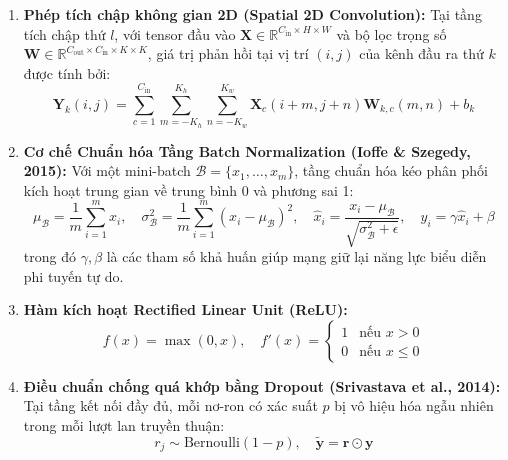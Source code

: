\documentclass[a4paper, 11pt]{article}
\begin{document}
\begin{enumerate}
    \item \textbf{Phép tích chập không gian 2D (Spatial 2D Convolution):} Tại tầng tích chập thứ $l$, với tensor đầu vào $\mathbf{X} \in \mathbb{R}^{C_{\text{in}} \times H \times W}$ và bộ lọc trọng số $\mathbf{W} \in \mathbb{R}^{C_{\text{out}} \times C_{\text{in}} \times K \times K}$, giá trị phản hồi tại vị trí $(i, j)$ của kênh đầu ra thứ $k$ được tính bởi:
    \begin{equation}
        \mathbf{Y}_k(i, j) = \sum_{c=1}^{C_{\text{in}}} \sum_{m=-K_h}^{K_h} \sum_{n=-K_w}^{K_w} \mathbf{X}_c(i+m, j+n) \mathbf{W}_{k,c}(m, n) + b_k
        \label{eq:conv2d}
    \end{equation}

    \item \textbf{Cơ chế Chuẩn hóa Tầng Batch Normalization (Ioffe \& Szegedy, 2015):} Với một mini-batch $\mathcal{B} = \{x_1, \dots, x_m\}$, tầng chuẩn hóa kéo phân phối kích hoạt trung gian về trung bình 0 và phương sai 1:
    \begin{equation}
        \mu_{\mathcal{B}} = \frac{1}{m} \sum_{i=1}^m x_i, \quad \sigma^2_{\mathcal{B}} = \frac{1}{m} \sum_{i=1}^m (x_i - \mu_{\mathcal{B}})^2, \quad \hat{x}_i = \frac{x_i - \mu_{\mathcal{B}}}{\sqrt{\sigma^2_{\mathcal{B}} + \epsilon}}, \quad y_i = \gamma \hat{x}_i + \beta
        \label{eq:batchnorm}
    \end{equation}
    trong đó $\gamma, \beta$ là các tham số khả huấn giúp mạng giữ lại năng lực biểu diễn phi tuyến tự do.

    \item \textbf{Hàm kích hoạt Rectified Linear Unit (ReLU):}
    \begin{equation}
        f(x) = \max(0, x), \quad f'(x) = \begin{cases} 1 & \text{nếu } x > 0 \\ 0 & \text{nếu } x \le 0 \end{cases}
        \label{eq:relu}
    \end{equation}

    \item \textbf{Điều chuẩn chống quá khớp bằng Dropout (Srivastava et al., 2014):} Tại tầng kết nối đầy đủ, mỗi nơ-ron có xác suất $p$ bị vô hiệu hóa ngẫu nhiên trong mỗi lượt lan truyền thuận:
    \begin{equation}
        r_j \sim \text{Bernoulli}(1 - p), \quad \tilde{\mathbf{y}} = \mathbf{r} \odot \mathbf{y}
        \label{eq:dropout}
    \end{equation}
\end{enumerate}
\end{document}
